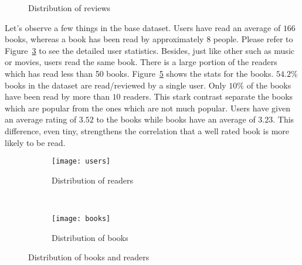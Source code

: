 \documentclass[11pt]{article}
\begin{document}
\begin{figure}
        \centering
        \begin{subfigure}[b]{0.5\textwidth}
                \label{fig:all_reviews}
        \end{subfigure}%
        \caption{Distribution of reviews}
\end{figure}
Let's observe a few things in the base dataset. Users have read an average of $166$ books, whereas a book has been read by approximately $8$ people. Please refer to Figure~\ref{fig:readers_book_read} to see the detailed user statistics.  Besides, just like other such as music or movies, users read the same book. There is a large portion of the readers which has read less than 50 books. Figure~\ref{fig:books_books_read} shows the stats for the books. $54.2\%$ books in the dataset are read/reviewed by a single user. Only $10$\% of the books have been read by more than $10$ readers. This stark contrast separate the books which are popular from the ones which are not much popular. Users have given an average rating of $3.52$ to the books while books have an average of $3.23$. This difference, even tiny, strengthens the correlation that a well rated book is more likely to be read.



\begin{figure}[ht]
        \centering
        \begin{subfigure}[b]{0.5\textwidth}
                \texttt{[image: users]}
                \caption{Distribution of readers}
                \label{fig:readers_book_read}
        \end{subfigure}%
        ~ %
        \begin{subfigure}[b]{0.5\textwidth}
                \texttt{[image: books]}
                \caption{Distribution of books}
                \label{fig:books_books_read}
        \end{subfigure}
        \caption{Distribution of books and readers}
\end{figure}

\end{document}
